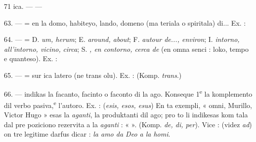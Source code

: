 \begin{VUpage}[75]{71}
\VUcontinue
ica. --- \cc
{} --- \nl
{}

\VUblanc{5.74pt}%
63. ---  = en la domo, habiteyo, lando, domeno (ma\cc
teriala o spiritala) di... Ex. : \nl
{}\nl
{}\nl
{}\nl
{}

\VUblanc{5.42pt}%
64. ---  = D. \textit{um, herum}; E. \textit{around, about};\nl
F. \textit{autour de..., environ}; I. \textit{intorno, all'intorno, vicino,}\nl
\textit{circa}; S. \textit{, en contorno, cerca de} (en omna senci :\nl
loko, tempo e quanteso). Ex. : \nl
{}\nl
{}

\VUblanc{4.72pt}%
65. ---  = sur ica latero (ne trans olu). Ex. : \nl
{}\nl
{}\nl
(Komp. \textit{trans}.)

\VUblanc{4.90pt}%
66. ---  indikas la facanto, facinto o faconto di la\nl
ago. Konseque 1\textsuperscript{e} la komplemento dil verbo pasiva,\textsuperscript{e} l'autoro. Ex. :  (\textit{esis, esos, esus}) \nl
{} En ta\nl
exempli, « omni, Murillo, Victor Hugo » esas la \textit{aganti}, la\nl
produktanti dil ago; pro to li indikesas kom tala dal pre\cc
poziciono rezervita a la \textit{aganti} : «  ». (Komp. \textit{de, di, per}).\nl
Vice :  (videz \textit{ad}) on tre legitime\nl
darfus dicar : \textit{la amo da Deo a la homi}.


\end{VUpage}
